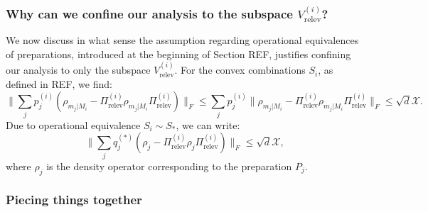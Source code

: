 \subsubsection{Why can we confine our analysis to the subspace $V_{\text{relev}}^{(i)}$?}
We now discuss in what sense the assumption regarding operational equivalences of preparations, introduced at the beginning of Section REF, justifies confining our analysis to only the subspace $V_{\text{relev}}^{(i)}$. 
For the convex combinations $S_i$, as defined in REF, we find:
\begin{equation}
\|\sum_j p_j^{(i)}(\rho_{m_j\vert M_i}-\Pi_{\text{relev}}^{(i)}\rho_{m_j\vert M_i}\Pi_{\text{relev}}^{(i)})\|_F \leq \sum_j p_j^{(i)}\|\rho_{m_j\vert M_i}-\Pi_{\text{relev}}^{(i)}\rho_{m_j\vert M_i}\Pi_{\text{relev}}^{(i)}\|_F \leq \sqrt{d}\mathcal{X}.
\end{equation}
Due to operational equivalence $S_i\sim S_{*}$, we can write:
\begin{equation}
\|\sum_j q_j^{(*)}(\rho_{j}-\Pi_{\text{relev}}^{(i)}\rho_{j}\Pi_{\text{relev}}^{(i)})\|_F \leq \sqrt{d}\mathcal{X},
\end{equation}
where $\rho_{j}$ is the density operator corresponding to the preparation $P_j$.

\subsubsection{Piecing things together}